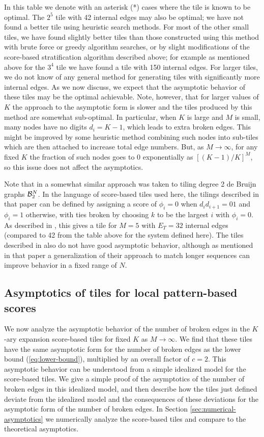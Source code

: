 \documentclass[12pt]{article}
\begin{document}
In this table we denote with an asterisk (*) cases where the tile is
known to be optimal.  The $2^5$ tile with 42 internal edges may also
be optimal; we have not found a better tile using heuristic search
methods.  For most of the other small tiles, we have found slightly
better tiles than those constructed using this method with brute force
or greedy algorithm searches, or by slight modifications of the
score-based stratification algorithm described above; for example as
mentioned above for the $3^4$ tile we have found a tile with 150
internal edges.  For larger tiles, we do not know of any general
method for generating tiles with significantly more internal edges.  As we now
discuss, we expect that the asymptotic behavior of these tiles may be
the optimal achievable.  Note, however, that for larger values of $K$
the approach to the asymptotic form is slower and the tiles produced
by this method are somewhat sub-optimal.  In particular, when $K$ is
large and $M$ is small, many nodes have no digits $d_i = K -1$, which
leads to extra broken edges.  This might be improved by some heuristic
method combining such nodes into sub-tiles which are then attached to
increase total edge numbers.  But, as $M \rightarrow \infty$, for any
fixed $K$ the fraction of such nodes goes to 0 exponentially as $[(K
  -1)/K]^M$, so this issue does not affect the asymptotics.


Note that in \cite{Viterbi} a somewhat similar approach was taken to
tiling degree 2 de Bruijn graphs ${\cal B}_2^N$.  In the language of
score-based tiles used here, the tilings described in that paper can
be defined by assigning a score of $\phi_i = 0$ when $d_id_{i +1} =
01$ and $\phi_i = 1$ otherwise, with ties broken by choosing $k$ to be
the largest $i$ with $\phi_i = 0$.  As described in \cite{Viterbi},
this gives a tile for $M = 5$ with $E_T = 32$ internal edges (compared
to 42 from the table above for the system defined here).  The tiles
described in \cite{Viterbi} also do not have good asymptotic behavior,
although as mentioned in that paper a generalization of their approach
to match longer sequences can improve behavior in a fixed range of $N$.

\subsection{Asymptotics of  tiles for local pattern-based scores}

We now analyze the asymptotic behavior of the number of broken edges
in the $K$-ary expansion score-based tiles for fixed $K$ as $M
\rightarrow \infty$.  We find that these tiles have the same
asymptotic form for the number of broken edges as the lower bound
(\ref{eq:lower-bound}), multiplied by an overall factor of $c = 2$.
This asymptotic behavior can be understood from a simple idealized
model for the score-based tiles.
We give a simple proof of the asymptotics of the number of broken
edges in this idealized model, and then describe how the tiles just
defined deviate from the idealized model and the consequences of
these deviations for the asymptotic form of the number of broken
edges.  In Section \ref{sec:numerical-asymptotics} we numerically
analyze the score-based tiles and compare to the theoretical asymptotics.
\end{document}
